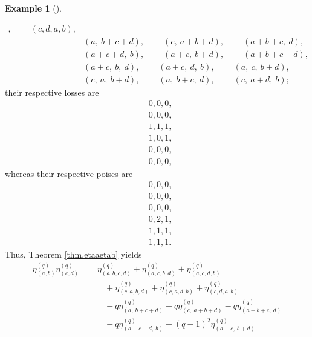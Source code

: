 \documentclass[numbers=enddot,12pt,final,onecolumn,notitlepage]{scrartcl}%
\theoremstyle{definition}
\newtheorem{exam}[theo]{Example}
\newenvironment{example}[1][]
{\begin{exam}[#1]\begin{leftbar}}
{\end{leftbar}\end{exam}}
\begin{document}
\begin{example}
\begin{align*}
,\ \ \ \ \ \ \ \ \ \ \left(  c,d,a,b\right)  ,\\
&  \left(  a,\ b+c+d\right)  ,\ \ \ \ \ \ \ \ \ \ \left(  c,\ a+b+d\right)
,\ \ \ \ \ \ \ \ \ \ \left(  a+b+c,\ d\right)  ,\\
&  \left(  a+c+d,\ b\right)  ,\ \ \ \ \ \ \ \ \ \ \left(  a+c,\ b+d\right)
,\ \ \ \ \ \ \ \ \ \ \left(  a+b+c+d\right)  ,\\
&  \left(  a+c,\ b,\ d\right)  ,\ \ \ \ \ \ \ \ \ \ \left(
a+c,\ d,\ b\right)  ,\ \ \ \ \ \ \ \ \ \ \left(  a,\ c,\ b+d\right)  ,\\
&  \left(  c,\ a,\ b+d\right)  ,\ \ \ \ \ \ \ \ \ \ \left(
a,\ b+c,\ d\right)  ,\ \ \ \ \ \ \ \ \ \ \left(  c,\ a+d,\ b\right)  ;
\end{align*}
their respective losses are
\begin{align*}
&  0,0,0,\\
&  0,0,0,\\
&  1,1,1,\\
&  1,0,1,\\
&  0,0,0,\\
&  0,0,0,
\end{align*}
whereas their respective poises are%
\begin{align*}
&  0,0,0,\\
&  0,0,0,\\
&  0,0,0,\\
&  0,2,1,\\
&  1,1,1,\\
&  1,1,1.
\end{align*}
Thus, Theorem \ref{thm.etaaetab} yields%
\begin{align*}
\eta_{\left(  a,b\right)  }^{\left(  q\right)  }\eta_{\left(  c,d\right)
}^{\left(  q\right)  }  &  =\eta_{\left(  a,b,c,d\right)  }^{\left(  q\right)
}+\eta_{\left(  a,c,b,d\right)  }^{\left(  q\right)  }+\eta_{\left(
a,c,d,b\right)  }^{\left(  q\right)  }\\
&  \ \ \ \ \ \ \ \ \ \ +\eta_{\left(  c,a,b,d\right)  }^{\left(  q\right)
}+\eta_{\left(  c,a,d,b\right)  }^{\left(  q\right)  }+\eta_{\left(
c,d,a,b\right)  }^{\left(  q\right)  }\\
&  \ \ \ \ \ \ \ \ \ \ -q\eta_{\left(  a,\ b+c+d\right)  }^{\left(  q\right)
}-q\eta_{\left(  c,\ a+b+d\right)  }^{\left(  q\right)  }-q\eta_{\left(
a+b+c,\ d\right)  }^{\left(  q\right)  }\\
&  \ \ \ \ \ \ \ \ \ \ -q\eta_{\left(  a+c+d,\ b\right)  }^{\left(  q\right)
}+\left(  q-1\right)  ^{2}\eta_{\left(  a+c,\ b+d\right)  }^{\left(  q\right)
}
\end{align*}
\end{example}
\end{document}
